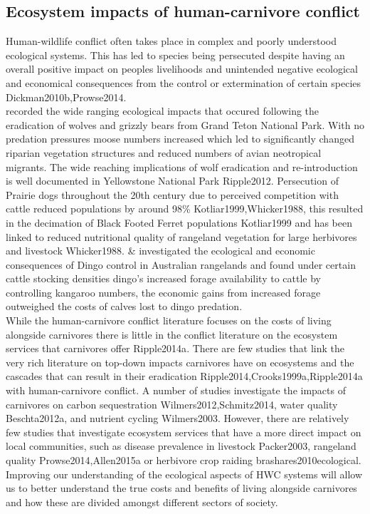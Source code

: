 \subsection{Ecosystem impacts of human-carnivore conflict}
Human-wildlife conflict often takes place in complex and poorly understood ecological systems. This has led to species being persecuted despite having an overall positive impact on peoples livelihoods and unintended negative ecological and economical consequences from the control or extermination of certain species {Dickman2010b,Prowse2014}.\\

\citet{Berger2001} recorded the wide ranging ecological impacts that occured following the eradication of wolves and grizzly bears from Grand Teton National Park. With no predation pressures moose numbers increased which led to significantly changed riparian vegetation structures and reduced numbers of avian neotropical migrants. The wide reaching implications of wolf eradication and re-introduction is well documented in Yellowstone National Park {Ripple2012}. Persecution of Prairie dogs throughout the 20th century due to perceived competition with cattle reduced populations by around 98\% {Kotliar1999,Whicker1988}, this resulted in the decimation of Black Footed Ferret populations {Kotliar1999} and has been linked to reduced nutritional quality of rangeland vegetation for large herbivores and livestock {Whicker1988}. \citet{Prowse2014} \& \citet{Allen2015a} investigated the ecological and economic consequences of Dingo control in Australian rangelands and found under certain cattle stocking densities dingo's increased forage availability to cattle by controlling kangaroo numbers, the economic gains from increased forage outweighed the costs of calves lost to dingo predation.\\

While the human-carnivore conflict literature focuses on the costs of living alongside carnivores there is little in the conflict literature on the ecosystem services that carnivores offer {Ripple2014a}. There are few studies that link the very rich literature on top-down impacts carnivores have on ecosystems and the cascades that can result in their eradication {Ripple2014,Crooks1999a,Ripple2014a} with human-carnivore conflict. A number of studies investigate the impacts of carnivores on carbon sequestration {Wilmers2012,Schmitz2014}, water quality {Beschta2012a}, and nutrient cycling {Wilmers2003}. However, there are relatively few studies that investigate ecosystem services that have a more direct impact on local communities, such as disease prevalence in livestock {Packer2003}, rangeland quality {Prowse2014,Allen2015a} or herbivore crop raiding {brashares2010ecological}. Improving our understanding of the ecological aspects of HWC systems will allow us to better understand the true costs and benefits of living alongside carnivores and how these are divided amongst different sectors of society.

